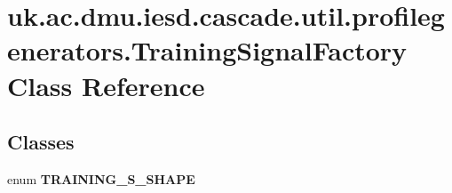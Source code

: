 \hypertarget{classuk_1_1ac_1_1dmu_1_1iesd_1_1cascade_1_1util_1_1profilegenerators_1_1_training_signal_factory}{\section{uk.\-ac.\-dmu.\-iesd.\-cascade.\-util.\-profilegenerators.\-Training\-Signal\-Factory Class Reference}
\label{classuk_1_1ac_1_1dmu_1_1iesd_1_1cascade_1_1util_1_1profilegenerators_1_1_training_signal_factory}
}
\subsection*{Classes}
\begin{DoxyCompactItemize}
\item 
enum {\bfseries T\-R\-A\-I\-N\-I\-N\-G\-\_\-\-S\-\_\-\-S\-H\-A\-P\-E}
\end{DoxyCompactItemize}
